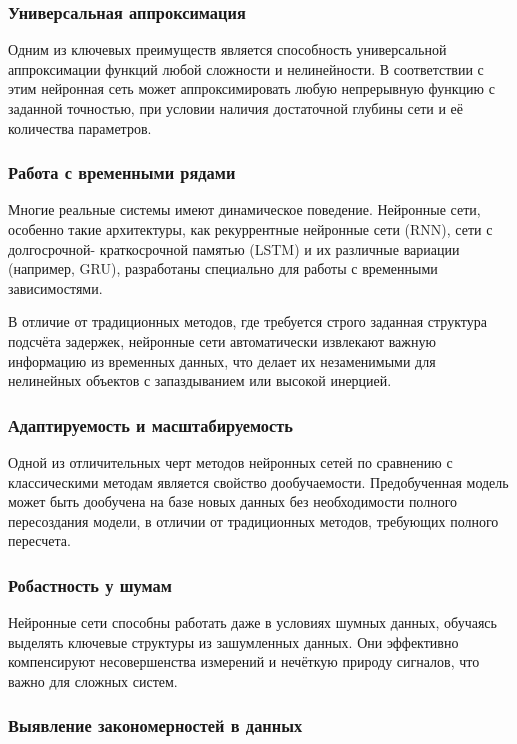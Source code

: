 \subsubsection{Универсальная аппроксимация}
Одним из ключевых преимуществ является способность универсальной аппроксимации
функций любой сложности и нелинейности. В соответствии с этим нейронная сеть
может аппроксимировать любую непрерывную функцию с заданной точностью, при
условии наличия достаточной глубины сети и её количества параметров.

\subsubsection{Работа с временными рядами}

Многие реальные системы имеют динамическое поведение. Нейронные сети, особенно
такие архитектуры, как рекуррентные нейронные сети (RNN), сети с долгосрочной-
краткосрочной памятью (LSTM) и их различные вариации (например, GRU), разработаны
специально для работы с временными зависимостями.

В отличие от традиционных методов, где требуется строго заданная структура
подсчёта задержек, нейронные сети автоматически извлекают важную информацию из
временных данных, что делает их незаменимыми для нелинейных объектов с
запаздыванием или высокой инерцией.

\subsubsection{Адаптируемость и масштабируемость}

Одной из отличительных черт методов нейронных сетей по сравнению с
классическими методам является свойство дообучаемости. Предобученная модель
может быть дообучена на базе новых данных без необходимости полного
пересоздания модели, в отличии от традиционных методов, требующих полного
пересчета.

\subsubsection{Робастность у шумам}

Нейронные сети способны работать даже в условиях шумных данных, обучаясь
выделять ключевые структуры из зашумленных данных. Они эффективно компенсируют
несовершенства измерений и нечёткую природу сигналов, что важно для сложных
систем.


\subsubsection{Выявление закономерностей в данных}

